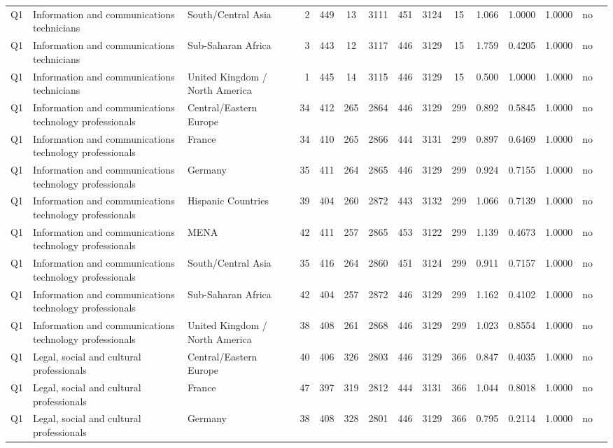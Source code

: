 \begin{longtable}{lllrcccccccccll}
Q1 & Information and communications technicians & South/Central Asia & 2 & 449 & 13 & 3111 & 451 & 3124 & 15 & 1.066 & 1.0000 & 1.0000 & no \\
Q1 & Information and communications technicians & Sub-Saharan Africa & 3 & 443 & 12 & 3117 & 446 & 3129 & 15 & 1.759 & 0.4205 & 1.0000 & no \\
Q1 & Information and communications technicians & United Kingdom / North America & 1 & 445 & 14 & 3115 & 446 & 3129 & 15 & 0.500 & 1.0000 & 1.0000 & no \\
Q1 & Information and communications technology professionals & Central/Eastern Europe & 34 & 412 & 265 & 2864 & 446 & 3129 & 299 & 0.892 & 0.5845 & 1.0000 & no \\
Q1 & Information and communications technology professionals & France & 34 & 410 & 265 & 2866 & 444 & 3131 & 299 & 0.897 & 0.6469 & 1.0000 & no \\
Q1 & Information and communications technology professionals & Germany & 35 & 411 & 264 & 2865 & 446 & 3129 & 299 & 0.924 & 0.7155 & 1.0000 & no \\
Q1 & Information and communications technology professionals & Hispanic Countries & 39 & 404 & 260 & 2872 & 443 & 3132 & 299 & 1.066 & 0.7139 & 1.0000 & no \\
Q1 & Information and communications technology professionals & MENA & 42 & 411 & 257 & 2865 & 453 & 3122 & 299 & 1.139 & 0.4673 & 1.0000 & no \\
Q1 & Information and communications technology professionals & South/Central Asia & 35 & 416 & 264 & 2860 & 451 & 3124 & 299 & 0.911 & 0.7157 & 1.0000 & no \\
Q1 & Information and communications technology professionals & Sub-Saharan Africa & 42 & 404 & 257 & 2872 & 446 & 3129 & 299 & 1.162 & 0.4102 & 1.0000 & no \\
Q1 & Information and communications technology professionals & United Kingdom / North America & 38 & 408 & 261 & 2868 & 446 & 3129 & 299 & 1.023 & 0.8554 & 1.0000 & no \\
Q1 & Legal, social and cultural professionals & Central/Eastern Europe & 40 & 406 & 326 & 2803 & 446 & 3129 & 366 & 0.847 & 0.4035 & 1.0000 & no \\
Q1 & Legal, social and cultural professionals & France & 47 & 397 & 319 & 2812 & 444 & 3131 & 366 & 1.044 & 0.8018 & 1.0000 & no \\
Q1 & Legal, social and cultural professionals & Germany & 38 & 408 & 328 & 2801 & 446 & 3129 & 366 & 0.795 & 0.2114 & 1.0000 & no \\

\end{longtable}
